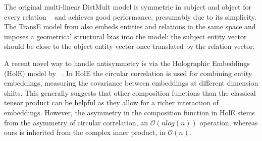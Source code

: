 \documentclass{article}
\newcommand{\Johans}[1]{\todo[inline,backgroundcolor=green!20!green]{Johans: #1}}
\newcommand{\Seb}[1]{\todo[inline,backgroundcolor=white!20!white]{Seb: #1}}
\begin{document}
The original multi-linear DistMult model is symmetric in subject and object for every relation ~\cite{Yang2015} and achieves good performance, presumably due to its simplicity.
The TransE model from \citet{bordes2013translating} also embeds entities and relations in the same space and imposes a geometrical structural bias into the model: the subject entity vector should be close to the object entity vector once translated by the relation vector.


A recent novel way to handle antisymmetry is via the Holographic Embeddings (HolE) model by ~\cite{nickel_2016_holographic}. In HolE the circular correlation is used for combining entity embeddings, measuring the covariance between embeddings at different dimension shifts. This generally suggests that other composition functions than the classical tensor product can be  helpful as they allow for a richer interaction of embeddings. However, the asymmetry in the composition function in HolE stems from the asymmetry of circular correlation, an $\mathcal{O}(n log(n))$ operation, whereas ours is inherited from the complex inner product, in $\mathcal{O}(n)$.







\end{document}
